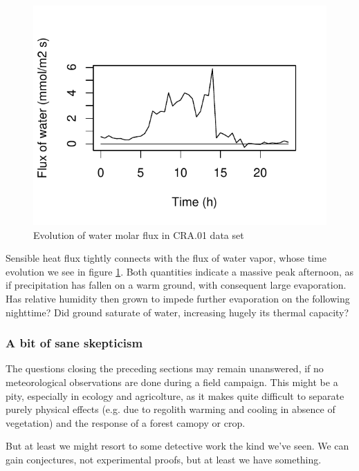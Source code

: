\documentclass[a4paper,10pt]{book}
\begin{document}
\begin{figure}[htp]
 \centering
 \begin{center}
 \includegraphics[scale=1.1,keepaspectratio=true]{./diagrams/CRA01_Fq.pdf}
 \end{center}
 \caption{Evolution of water molar flux in CRA.01 data set}
 \label{fig:CRA.01 Fq}
\end{figure}

Sensible heat flux tightly connects with the flux of water vapor, whose time evolution we see in figure \ref{fig:CRA.01 Fq}. Both quantities indicate a massive peak afternoon, as if precipitation has fallen on a warm ground, with consequent large evaporation. Has relative humidity then grown to impede further evaporation on the following nighttime? Did ground saturate of water, increasing hugely its thermal capacity?

\subsubsection{A bit of sane skepticism}\label{sec:Sane skepticism}

The questions closing the preceding sections may remain unanswered, if no meteorological observations are done during a field campaign. This might be a pity, especially in ecology and agricolture, as it makes quite difficult to separate purely physical effects (e.g. due to regolith warming and cooling in absence of vegetation) and the response of a forest camopy or crop.

But at least we might resort to some detective work the kind we've seen. We can gain conjectures, not experimental proofs, but at least we have something.
\end{document}
